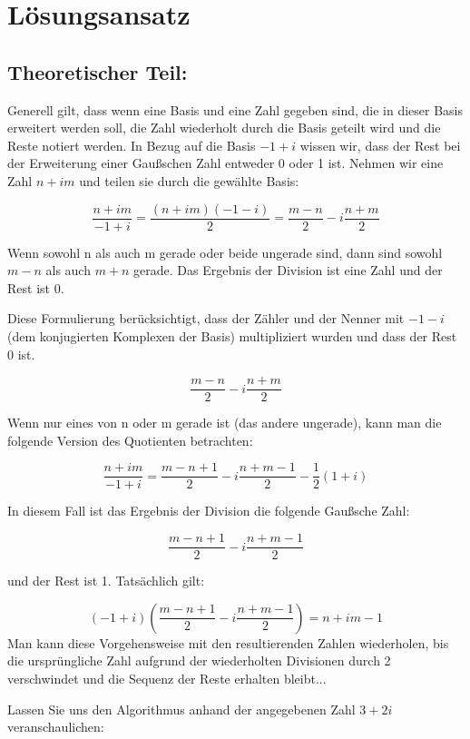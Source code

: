 \documentclass[course=erap]{aspdoc}
\begin{document}
\section{Lösungsansatz}

\subsection{Theoretischer Teil:}
Generell gilt, dass wenn eine Basis und eine Zahl gegeben sind, die in dieser Basis erweitert werden soll, die Zahl wiederholt durch die Basis geteilt wird und die Reste notiert werden. In Bezug auf die Basis $-1+i$ wissen wir, dass der Rest bei der Erweiterung einer Gaußschen Zahl entweder 0 oder 1 ist.\cite{complex_base_conversion}
\newline
\newline
Nehmen wir eine Zahl $n + im$ und teilen sie durch die gewählte Basis:

\[\frac{{n + im}}{{-1 + i}} = \frac{{(n + im)(-1 - i)}}{2} = \frac{{m - n}}{2} - i\frac{{n + m}}{2}\]

Wenn sowohl n als auch m gerade oder beide ungerade sind, dann sind sowohl $m-n$ als auch $m+n$ gerade. Das Ergebnis der Division ist eine Zahl und der Rest ist 0.

Diese Formulierung berücksichtigt, dass der Zähler und der Nenner mit $-1-i$  (dem konjugierten Komplexen der Basis) multipliziert wurden und dass der Rest 0 ist.

\[\frac{{m - n}}{{2}} - i\frac{{n + m}}{2}\]

Wenn nur eines von n oder m gerade ist (das andere ungerade), kann man die folgende Version des Quotienten betrachten:

\[\frac{{n + im}}{{-1 + i}} = \frac{{m - n + 1}}{2} - i \frac{{n + m -1}}{2} - \frac{{1}}{2}(1 + i)\]

In diesem Fall ist das Ergebnis der Division die folgende Gaußsche Zahl:

\[\frac{{m - n + 1}}{{2}} - i\frac{{n + m - 1}}{2}\]

und der Rest ist 1. Tatsächlich gilt:

\[(-1 +i) (\frac{m - n + 1}{2} - i \frac{n + m - 1}{2}) = n +im - 1\]
Man kann diese Vorgehensweise mit den resultierenden Zahlen wiederholen, bis die ursprüngliche Zahl aufgrund der wiederholten Divisionen durch 2 verschwindet und die Sequenz der Reste erhalten bleibt...
\newline

Lassen Sie uns den Algorithmus anhand der angegebenen Zahl $3 + 2i$ veranschaulichen:
\end{document}
